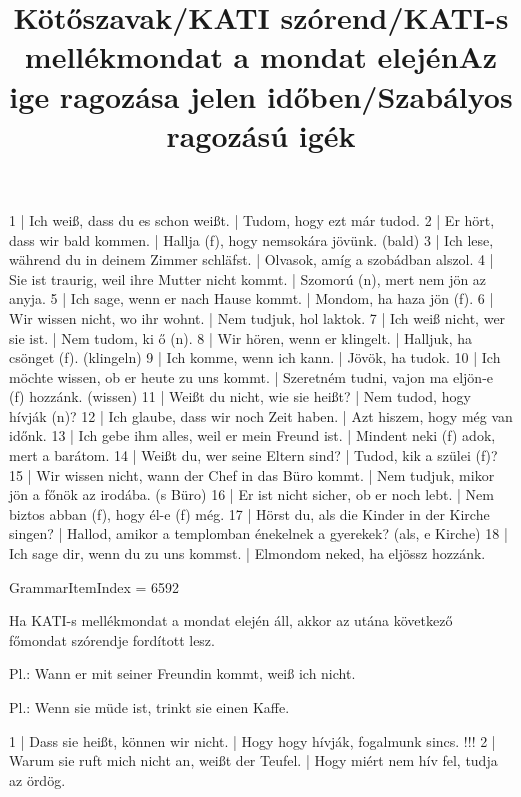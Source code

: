 \begin{exmp}
1 | Ich weiß, dass du es schon weißt. | Tudom, hogy ezt már tudod.
2 | Er hört, dass wir bald kommen. | Hallja (f), hogy nemsokára jövünk. (bald)
3 | Ich lese, während du in deinem Zimmer schläfst. | Olvasok, amíg a szobádban alszol.
4 | Sie ist traurig, weil ihre Mutter nicht kommt. | Szomorú (n), mert nem jön az anyja.
5 | Ich sage, wenn er nach Hause kommt. | Mondom, ha haza jön (f).
6 | Wir wissen nicht, wo ihr wohnt. | Nem tudjuk, hol laktok.
7 | Ich weiß nicht, wer sie ist. | Nem tudom, ki ő (n).
8 | Wir hören, wenn er klingelt. | Halljuk, ha csönget (f). (klingeln)
9 | Ich komme, wenn ich kann. | Jövök, ha tudok.
10 | Ich möchte wissen, ob er heute zu uns kommt. | Szeretném tudni, vajon ma eljön-e (f) hozzánk. (wissen)
11 | Weißt du nicht, wie sie heißt? | Nem tudod, hogy hívják (n)?
12 | Ich glaube, dass wir noch Zeit haben. | Azt hiszem, hogy még van időnk.
13 | Ich gebe ihm alles, weil er mein Freund ist. | Mindent neki (f) adok, mert a barátom.
14 | Weißt du, wer seine Eltern sind? | Tudod, kik a szülei (f)?
15 | Wir wissen nicht, wann der Chef in das Büro kommt. | Nem tudjuk, mikor jön a főnök az irodába. (s Büro)
16 | Er ist nicht sicher, ob er noch lebt. | Nem biztos abban (f), hogy él-e (f) még.
17 | Hörst du, als die Kinder in der Kirche singen? | Hallod, amikor a templomban énekelnek a gyerekek? (als, e Kirche)
18 | Ich sage dir, wenn du zu uns kommst. | Elmondom neked, ha eljössz hozzánk.
\end{exmp}

\title{Kötőszavak/KATI szórend/KATI-s mellékmondat a mondat elején}

GrammarItemIndex = 6592

\begin{desc}
Ha KATI-s mellékmondat a mondat elején áll, akkor az utána következő főmondat szórendje fordított lesz.

Pl.: Wann er mit seiner Freundin kommt, weiß ich nicht.

Pl.: Wenn sie müde ist, trinkt sie einen Kaffe.
\end{desc}

\begin{exmp}
1 | Dass sie heißt, können wir nicht. | Hogy hogy hívják, fogalmunk sincs. !!!
2 | Warum sie ruft mich nicht an, weißt der Teufel. | Hogy miért nem hív fel, tudja az ördög.
\end{exmp}

\title{Az ige ragozása jelen időben/Szabályos ragozású igék}

